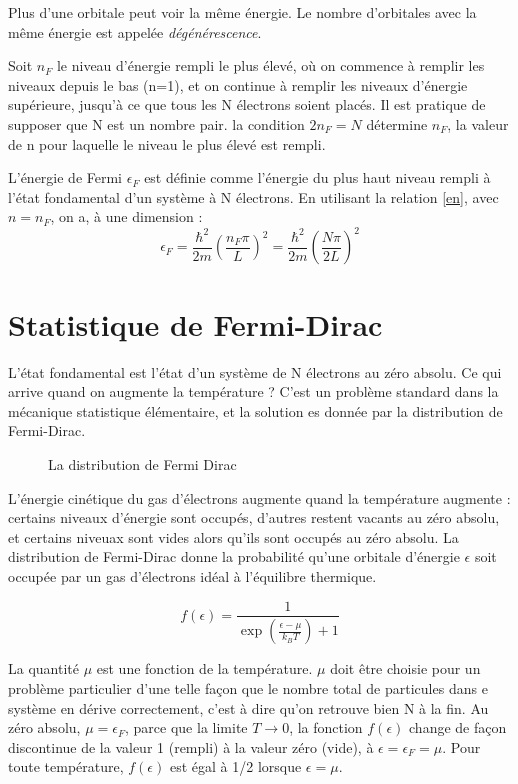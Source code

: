 Plus d'une orbitale peut voir la même énergie. Le nombre d'orbitales avec la même
énergie est appelée \emph{dégénérescence}.

Soit $n_F$ le niveau d'énergie rempli le plus élevé, où on commence à remplir les
niveaux depuis le bas (n=1), et on continue à remplir les niveaux d'énergie 
supérieure, jusqu'à ce que tous les N électrons soient placés. Il est pratique de
supposer que N est un nombre pair. la condition $2n_F = N$ détermine $n_F$, la
valeur de n pour laquelle le niveau le plus élevé est rempli.

L'énergie de Fermi $\epsilon_F$ est définie comme l'énergie du plus haut niveau
rempli à l'état fondamental d'un système à N électrons. En utilisant la relation
\ref{en}, avec $n=n_F$, on a, à une dimension :
\begin{equation}
    \epsilon_F = \frac{\hbar^2}{2m}\left(\frac{n_F\pi}{L}\right)^2 = 
    \frac{\hbar^2}{2m}\left( \frac{N\pi}{2L} \right)^2
\end{equation}


\section{Statistique de Fermi-Dirac}

L'état fondamental est l'état d'un système de N électrons au zéro absolu. Ce qui
arrive quand on augmente la température ? C'est un problème standard dans la
mécanique statistique élémentaire, et la solution es donnée par la distribution
de Fermi-Dirac.

\begin{figure}
    \TODO
    \caption{La distribution de Fermi Dirac}
    \label{fermidir}
\end{figure}


L'énergie cinétique du gas d'électrons augmente quand la température augmente :
certains niveaux d'énergie sont occupés, d'autres restent vacants au zéro absolu,
et certains niveuax sont vides alors qu'ils sont occupés au zéro absolu. La
distribution de Fermi-Dirac donne la probabilité qu'une orbitale d'énergie
$\epsilon$ soit occupée par un gas d'électrons idéal à l'équilibre thermique.

\begin{equation}
    f(\epsilon) = \frac{1}{\exp\left( \frac{\epsilon - \mu}{k_BT} \right) + 1}
\end{equation}

La quantité $\mu$ est une fonction de la température. $\mu$ doit être choisie
pour un problème particulier d'une telle façon que le nombre total de
particules dans e système en dérive correctement, c'est à dire qu'on retrouve
bien N à la fin. Au zéro absolu, $\mu = \epsilon_F$, parce que la limite
$T\rightarrow 0$, la fonction $f(\epsilon)$ change de façon discontinue de la
valeur 1 (rempli) à la valeur zéro (vide), à $\epsilon = \epsilon_F = \mu$. Pour
toute température, $f(\epsilon)$ est égal à 1/2 lorsque $\epsilon = \mu$.

